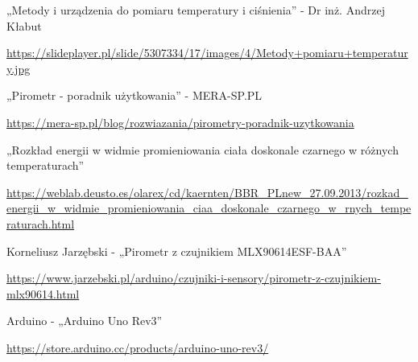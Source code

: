 \cleardoublepage
{}
{}
\begin{thebibliography}{999}
\begin{spacing}{1}


    





    

     „Metody i urządzenia do pomiaru temperatury i ciśnienia” - Dr inż. Andrzej Kłabut

    \url{https://slideplayer.pl/slide/5307334/17/images/4/Metody+pomiaru+temperatury.jpg}

     „Pirometr - poradnik użytkowania” - MERA-SP.PL

    \url{https://mera-sp.pl/blog/rozwiazania/pirometry-poradnik-uzytkowania}

     „Rozkład energii w widmie promieniowania ciała doskonale czarnego w różnych temperaturach”

    \url{https://weblab.deusto.es/olarex/cd/kaernten/BBR_PLnew_27.09.2013/rozkad_energii_w_widmie_promieniowania_ciaa_doskonale_czarnego_w_rnych_temperaturach.html}

     Korneliusz Jarzębski - „Pirometr z czujnikiem MLX90614ESF-BAA”

    \url{https://www.jarzebski.pl/arduino/czujniki-i-sensory/pirometr-z-czujnikiem-mlx90614.html}

     Arduino - „Arduino Uno Rev3”

    \url{https://store.arduino.cc/products/arduino-uno-rev3/}


\end{spacing}
\end{thebibliography}
